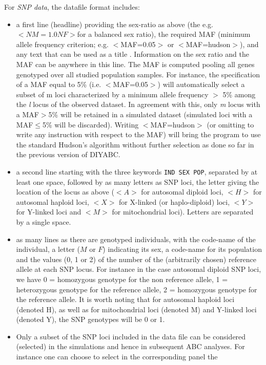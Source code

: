 For \emph{SNP data}, the datafile format includes:
\begin{itemize}
\item a first line (headline) providing the sex-ratio as above (the \textsf{e.g.$<NM=1.0NF>$}for
a balanced sex ratio), the required MAF (minimum allele frequency
criterion; e.g. \textsf{$<$MAF=0.05$>$ or $<$MAF=hudson$>$}), and any text
that can be used as a title . Information on the sex ratio and the
MAF can be anywhere in this line. The MAF is computed pooling all
genes genotyped over all studied population samples. For instance,
the specification of a MAF equal to 5\% (i.e. \textsf{$<$MAF=0.05$>$)}
will automatically select a subset of m loci characterized by a minimum
allele frequency $>$ 5\% among the \textit{l} locus of the observed
dataset. In agreement with this, only \textit{m} locus with a MAF$>$5\%
will be retained in a simulated dataset (simulated loci with a MAF\ensuremath{\le}5\%
will be discarded). Writing \textsf{$<$MAF=hudson$>$ }(or omitting to
write any instruction with respect to the MAF) will bring the program
to use the standard Hudson\textquoteright{}s algorithm without further
selection as done so far in the previous version of DIYABC.
\item a second line starting with the three keywords \texttt{IND SEX POP},
separated by at least one space, followed by as many letters as SNP
loci, the letter giving the location of the locus as above ($<A>$
for autosomal diploid loci, $<H>$ for autosomal haploid loci, $<X>$
for X-linked (or haplo-diploid) loci, $<Y>$ for Y-linked loci and
$<M>$ for mitochondrial loci). Letters are separated by a single
space.
\item as many lines as there are genotyped individuals, with the code-name
of the individual, a letter ($M$ or $F$) indicating its sex, a code-name
for its population and the values (0, 1 or 2) of the number of the
(arbitrarily chosen) reference allele at each SNP locus. For instance
in the case autosomal diploid SNP loci, we have 0 = homozygous genotype
for the non reference allele, 1 = heterozygous genotype for the reference
allele, 2 = homozygous genotype for the reference allele. It is worth
noting that for autosomal haploid loci (denoted H), as well as for
mitochondrial loci (denoted M) and Y-linked loci (denoted Y), the
SNP genotypes will be 0 or 1.
\item Only a subset of the SNP loci included in the data file can be considered
(selected) in the simulations and hence in subsequent ABC analyses.
For instance one can choose to select in the corresponding panel the

\end{itemize}
